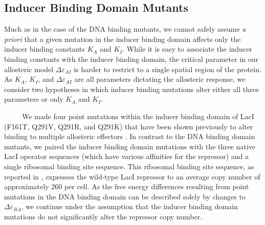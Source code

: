 \documentclass[12pt]{caltech_thesis}
\begin{document}
\hypertarget{inducer-binding-domain-mutants}{%
\subsection{Inducer Binding Domain
Mutants}\label{inducer-binding-domain-mutants}}

Much as in the case of the DNA binding mutants, we cannot safely assume
\emph{a priori} that a given mutation in the inducer binding domain
affects only the inducer binding constants \(K_A\) and \(K_I\). While it
is easy to associate the inducer binding constants with the inducer
binding domain, the critical parameter in our allosteric model
\(\Delta\varepsilon_{AI}\) is harder to restrict to a single spatial
region of the protein. As \(K_A\), \(K_I\), and
\(\Delta\varepsilon_{AI}\) are all parameters dictating the allosteric
response, we consider two hypotheses in which inducer binding mutations
alter either all three parameters or only \(K_A\) and \(K_I\).

~~~~~We made four point mutations within the inducer binding domain of
LacI (F161T, Q291V, Q291R, and Q291K) that have been shown previously to
alter binding to multiple allosteric effectors \autocite{daber2009a}. In
contrast to the DNA binding domain mutants, we paired the inducer
binding domain mutations with the three native LacI operator sequences
(which have various affinities for the repressor) and a single ribosomal
binding site sequence. This ribosomal binding site sequence, as reported
in \textcite{garcia2011}, expresses the wild-type LacI repressor to an
average copy number of approximately \(260\) per cell. As the free
energy differences resulting from point mutations in the DNA binding
domain can be described solely by changes to \(\Delta\varepsilon_{RA}\),
we continue under the assumption that the inducer binding domain
mutations do not significantly alter the repressor copy number.
\end{document}
